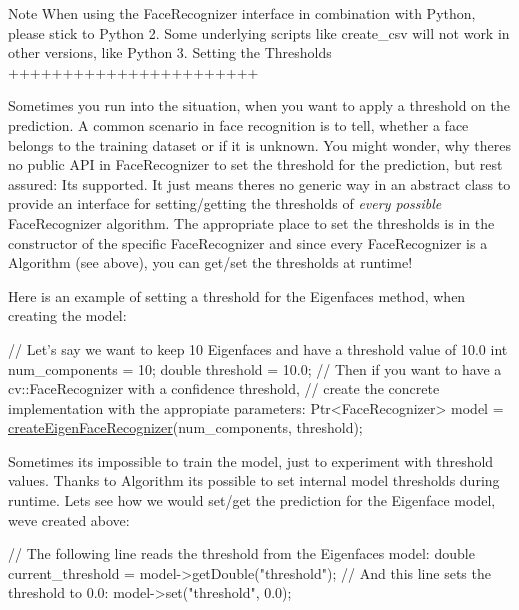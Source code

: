 \begin{DoxyNote}{Note}
When using the Face\+Recognizer interface in combination with Python, please stick to Python 2. Some underlying scripts like create\+\_\+csv will not work in other versions, like Python 3. Setting the Thresholds +++++++++++++++++++++++ 
\end{DoxyNote}
Sometimes you run into the situation, when you want to apply a threshold on the prediction. A common scenario in face recognition is to tell, whether a face belongs to the training dataset or if it is unknown. You might wonder, why there\textquotesingle{}s no public A\+PI in Face\+Recognizer to set the threshold for the prediction, but rest assured\+: It\textquotesingle{}s supported. It just means there\textquotesingle{}s no generic way in an abstract class to provide an interface for setting/getting the thresholds of {\itshape every possible} Face\+Recognizer algorithm. The appropriate place to set the thresholds is in the constructor of the specific Face\+Recognizer and since every Face\+Recognizer is a Algorithm (see above), you can get/set the thresholds at runtime! 

Here is an example of setting a threshold for the Eigenfaces method, when creating the model\+: 


\begin{DoxyPre}
\begin{DoxyCode}
\textcolor{comment}{// Let's say we want to keep 10 Eigenfaces and have a threshold value of 10.0}
\textcolor{keywordtype}{int} num\_components = 10;
\textcolor{keywordtype}{double} threshold = 10.0;
\textcolor{comment}{// Then if you want to have a cv::FaceRecognizer with a confidence threshold,}
\textcolor{comment}{// create the concrete implementation with the appropiate parameters:}
Ptr<FaceRecognizer> model = \hyperlink{group__face_ga6f3a56396530d46af3fba9ad04fc80cf}{createEigenFaceRecognizer}(num\_components, threshold);
\end{DoxyCode}
 \end{DoxyPre}
 

Sometimes it\textquotesingle{}s impossible to train the model, just to experiment with threshold values. Thanks to Algorithm it\textquotesingle{}s possible to set internal model thresholds during runtime. Let\textquotesingle{}s see how we would set/get the prediction for the Eigenface model, we\textquotesingle{}ve created above\+: 


\begin{DoxyPre}
\begin{DoxyCode}
\textcolor{comment}{// The following line reads the threshold from the Eigenfaces model:}
\textcolor{keywordtype}{double} current\_threshold = model->getDouble(\textcolor{stringliteral}{"threshold"});
\textcolor{comment}{// And this line sets the threshold to 0.0:}
model->set(\textcolor{stringliteral}{"threshold"}, 0.0);
\end{DoxyCode}
 \end{DoxyPre}
 


